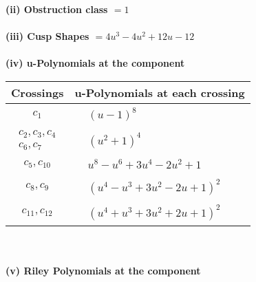 \documentclass[1p]{elsarticle_modified}
\theoremstyle{definition}
\begin{document}
\flushleft \textbf{(ii) Obstruction class $= 1$}\\~\\
\flushleft \textbf{(iii) Cusp Shapes $= 4 u^3-4 u^2+12 u-12$}\\~\\
\newpage\renewcommand{\arraystretch}{1}
\flushleft \textbf{(iv) u-Polynomials at the component}\newline \\
\begin{tabular}{m{50pt}|m{274pt}}
Crossings & \hspace{64pt}u-Polynomials at each crossing \\
\hline $$\begin{aligned}c_{1}\end{aligned}$$&$\begin{aligned}
&(u-1)^8
\end{aligned}$\\
\hline $$\begin{aligned}c_{2},c_{3},c_{4}\\c_{6},c_{7}\end{aligned}$$&$\begin{aligned}
&(u^2+1)^4
\end{aligned}$\\
\hline $$\begin{aligned}c_{5},c_{10}\end{aligned}$$&$\begin{aligned}
&u^8- u^6+3 u^4-2 u^2+1
\end{aligned}$\\
\hline $$\begin{aligned}c_{8},c_{9}\end{aligned}$$&$\begin{aligned}
&(u^4- u^3+3 u^2-2 u+1)^2
\end{aligned}$\\
\hline $$\begin{aligned}c_{11},c_{12}\end{aligned}$$&$\begin{aligned}
&(u^4+u^3+3 u^2+2 u+1)^2
\end{aligned}$\\
\hline
\end{tabular}\\~\\
\newpage\renewcommand{\arraystretch}{1}
\flushleft \textbf{(v) Riley Polynomials at the component}\newline \\
\end{document}
